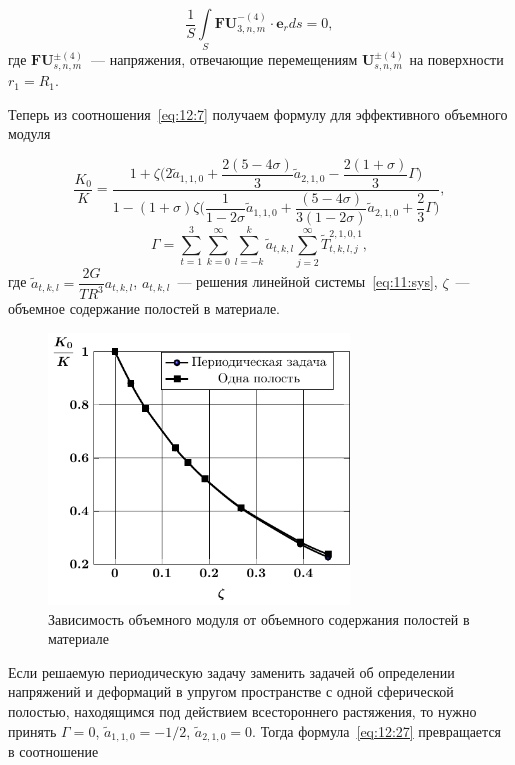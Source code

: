 \begin{equation}
\frac{1}{S}\int\limits_S \mathbf{FU}_{3,n,m}^{-(4)}\cdot\mathbf{e}_r ds=0,
\label{eq:12:26}
\end{equation}
где $\mathbf{FU}_{s,n,m}^{\pm(4)}$~--- напряжения, отвечающие перемещениям $\mathbf{U}_{s,n,m}^{\pm(4)}$ на поверхности $r_1=R_1$.

Теперь из соотношения~\eqref{eq:12:7} получаем формулу для эффективного объемного модуля

\begin{equation}
\frac{K_0}{K}=\frac{1+\zeta\bigg(2 \tilde a_{1,1,0}+\dfrac{2(5-4\sigma)}{3} \tilde a_{2,1,0}-\dfrac{2(1+\sigma)}{3}\Gamma\bigg)}{1-(1+\sigma)\zeta\bigg(\dfrac{1}{1-2\sigma} \tilde a_{1,1,0}+\dfrac{(5-4\sigma)}{3(1-2\sigma)} \tilde a_{2,1,0}+\dfrac{2}{3}\Gamma\bigg)},
\label{eq:12:27}
\end{equation}
$$
\Gamma=\sum\limits_{t=1}^3\sum\limits_{k=0}^\infty\sum\limits_{l=-k}^k \tilde a_{t,k,l}\sum\limits_{j=2}^\infty\tilde T_{t,k,l,j}^{2,1,0,1},
$$
где $\tilde a_{t,k,l}=\dfrac{2G}{TR^3}a_{t,k,l}$, $a_{t,k,l}$~--- решения линейной системы~\eqref{eq:11:sys}, $\zeta$~--- объемное содержание полостей в материале.

\begin{figure}[h!]
\centering
\includegraphics[width=8cm]{porous-spheres-k.pdf}
\caption{Зависимость объемного модуля от объемного содержания полостей в материале}
\label{f:12:2}
\end{figure}

Если решаемую периодическую задачу заменить задачей об определении напряжений и деформаций в упругом пространстве с одной сферической полостью, находящимся под действием всестороннего растяжения, то нужно принять $\Gamma=0$, $\tilde a_{1,1,0}=-1/2$, $\tilde a_{2,1,0}=0$. Тогда формула~\eqref{eq:12:27} превращается в соотношение

